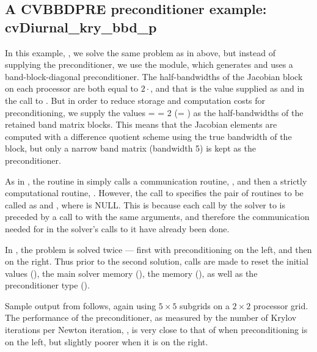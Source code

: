 

\subsection{A CVBBDPRE preconditioner example: cvDiurnal\_kry\_bbd\_p}\label{ss:cvDiurnal_bbd_p}

In this example, , we solve the same
problem as in 
above, but instead of supplying the preconditioner, we use the {\cvbbdpre} module,
which generates and uses a band-block-diagonal preconditioner.  The
half-bandwidths of the Jacobian block on each processor are both equal to
$2\cdot$, and that is the value supplied as  and 
in the call to .  But in order to reduce storage and computation
costs for preconditioning, we supply the values  =  = 2
(= ) as the half-bandwidths of the retained band matrix blocks.
This means that the Jacobian elements are computed with a difference quotient
scheme using the true bandwidth of the block, but only a narrow band matrix
(bandwidth 5) is kept as the preconditioner.

As in , the  routine in  simply calls a
communication routine, , and then a strictly computational routine,
.  However, the call to  specifies the pair of
routines to be called as  and , where  is NULL.
This is because each call by the solver to  is
preceded by a call to  with the same  arguments, and therefore the
communication needed for  in the solver's calls to it have already been
done.

In , the problem is solved twice --- first with preconditioning
on the left, and then on the right.  Thus prior to the second solution, calls
are made to reset the initial values (), the main solver
memory (), the {\cvbbdpre} memory (),
as well as the preconditioner type ().

Sample output from  follows, again using $5 \times 5$ subgrids 
on a $2 \times 2$ processor grid.  The performance of the preconditioner,
as measured by the number of Krylov iterations per Newton iteration,
, is very close to that of  when preconditioning is on
the left, but slightly poorer when it is on the right.


